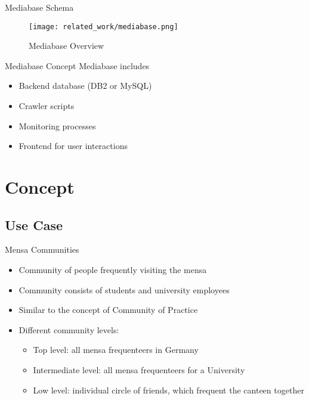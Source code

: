 \begin{frame}{Mediabase Schema}
  \begin{figure}[h]
    \centering
    \texttt{[image: related\_work/mediabase.png]}
    \caption{Mediabase Overview \cite{Klam10e}}
  \end{figure}
\end{frame}

\begin{frame}{Mediabase Concept}
  Mediabase includes
  \begin{itemize}
    \item Backend database (DB2 or MySQL)
    \item Crawler scripts
    \item Monitoring processes
    \item Frontend for user interactions
  \end{itemize}
\end{frame}

\section{Concept}
\subsection{Use Case}
\begin{frame}{Mensa Communities}
  \begin{itemize}
    \item Community of people frequently visiting the mensa
    \item Community consists of students and university employees
    \item Similar to the concept of Community of Practice %
    \item Different community levels:
          \begin{itemize}
            \item Top level: all mensa frequenteers in Germany
            \item Intermediate level: all mensa frequenteers for a University
            \item Low level: individual circle of friends, which frequent the canteen together %
          \end{itemize}
  \end{itemize}
\end{frame}



